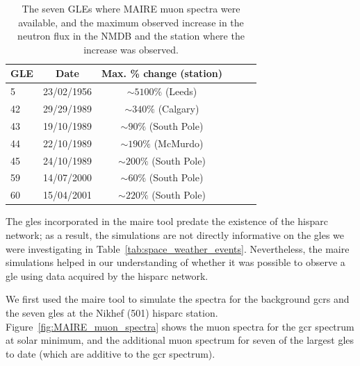 \begin{table}[ht!]
	\begin{center}
		\caption{The seven GLEs where MAIRE muon spectra were available, and the maximum observed increase in the neutron flux in the NMDB and the station where the increase was observed.}
		\label{tab:MAIRE_GLEs}
		\begin{tabular}{l c c c c c}
			\hline
			{\bf GLE} & {\bf Date} & {\bf Max. \% change (station)} \\
			\hline
			5  & 23/02/1956 & $\sim 5100\%$ (Leeds) \\
			42 & 29/29/1989 & $\sim 340\%$ (Calgary) \\
			43 & 19/10/1989 & $\sim 90\%$ (South Pole) \\
			44 & 22/10/1989 & $\sim 190\%$ (McMurdo) \\
			45 & 24/10/1989 & $\sim 200\%$ (South Pole) \\
			59 & 14/07/2000 & $\sim 60\%$ (South Pole) \\
			60 & 15/04/2001 & $\sim 220\%$ (South Pole) \\
			\hline
		\end{tabular}
	\end{center}
\end{table}

The \glspl{gle} incorporated in the \gls{maire} tool predate the existence of the \gls{hisparc} network; as a result, the simulations are not directly informative on the \glspl{gle} we were investigating in Table~\ref{tab:space_weather_events}. Nevertheless, the \gls{maire} simulations helped in our understanding of whether it was possible to observe a \gls{gle} using data acquired by the \gls{hisparc} network.


We first used the \gls{maire} tool to simulate the spectra for the background \glspl{gcr} and the seven \glspl{gle} at the Nikhef (501) \gls{hisparc} station. Figure~\ref{fig:MAIRE_muon_spectra} shows the muon spectra for the \gls{gcr} spectrum at solar minimum, and the additional muon spectrum for seven of the largest \glspl{gle} to date (which are additive to the \gls{gcr} spectrum).


